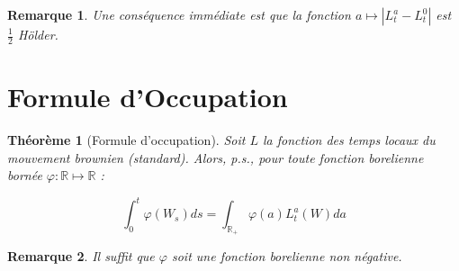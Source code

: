 \documentclass[openany]{book}
\newcommand{\R}{\mathbb{R}}
\newcommand{\1}{\mathbbm{1}}
\theoremstyle{thmfont}
\newtheorem{theorem}{Théorème}[chapter]
\theoremstyle{deffont}
\theoremstyle{thmfont}
\theoremstyle{deffont}
\newtheorem*{remark}{Remarque}
\begin{document}
\begin{remark}
  Une conséquence immédiate est que la fonction $a \mapsto |L_t^a - L_t^0|$ est $\frac{1}{2}$ Hölder. 
\end{remark}

\section{Formule d'Occupation}

\begin{theorem}[Formule d'occupation]
\label{thm:occupation} Soit $L$ la fonction des temps locaux du mouvement brownien (standard). Alors, p.s., pour toute fonction borelienne bornée $\varphi : \R \mapsto \R$ :

\begin{equation}
  \int_0^t \varphi(W_s) ds = \int_{\R_+}\varphi(a)L_t^a(W)da
  \label{eq:occupation}
\end{equation}

\end{theorem}

\begin{remark}
  Il suffit que $\varphi$ soit une fonction borelienne non négative.
  \end{remark}
\end{document}
